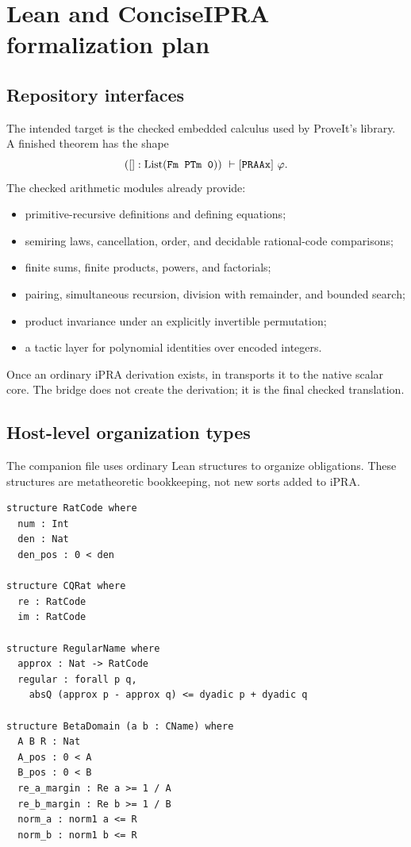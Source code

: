 \section{Lean and ConciseIPRA formalization plan}
\label{sec:lean}

\subsection{Repository interfaces}

The intended target is the checked embedded calculus used by ProveIt's
 library.  A finished theorem has the shape
\[
 ([]:\operatorname{List}(\code{Fm PTm 0}))
 \ \vdash[\code{PRAAx}]\ \varphi.
\]
The checked arithmetic modules already provide:

\begin{itemize}
\item primitive-recursive definitions and defining equations;
\item semiring laws, cancellation, order, and decidable rational-code comparisons;
\item finite sums, finite products, powers, and factorials;
\item pairing, simultaneous recursion, division with remainder, and bounded search;
\item product invariance under an explicitly invertible permutation;
\item a tactic layer for polynomial identities over encoded integers.
\end{itemize}

Once an ordinary iPRA derivation exists,  in
 transports it to the native scalar core.  The bridge does not create the derivation; it is the final checked translation.

\subsection{Host-level organization types}

The companion file  uses ordinary Lean structures to organize obligations.  These structures are metatheoretic bookkeeping, not new sorts added to iPRA.

\begin{lstlisting}[language={}]
structure RatCode where
  num : Int
  den : Nat
  den_pos : 0 < den

structure CQRat where
  re : RatCode
  im : RatCode

structure RegularName where
  approx : Nat -> RatCode
  regular : forall p q,
    absQ (approx p - approx q) <= dyadic p + dyadic q

structure BetaDomain (a b : CName) where
  A B R : Nat
  A_pos : 0 < A
  B_pos : 0 < B
  re_a_margin : Re a >= 1 / A
  re_b_margin : Re b >= 1 / B
  norm_a : norm1 a <= R
  norm_b : norm1 b <= R
\end{lstlisting}

